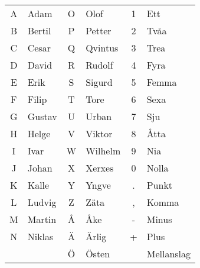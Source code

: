 \begin{center}
\begin{longtable}{cl|cl|cl }
	A & Adam   & O & Olof    & 1 & Ett        \\
	B & Bertil & P & Petter  & 2 & Tvåa       \\
	C & Cesar  & Q & Qvintus & 3 & Trea       \\
	D & David  & R & Rudolf  & 4 & Fyra       \\
	E & Erik   & S & Sigurd  & 5 & Femma      \\
	F & Filip  & T & Tore    & 6 & Sexa       \\
	G & Gustav & U & Urban   & 7 & Sju        \\
	H & Helge  & V & Viktor  & 8 & Åtta       \\
	I & Ivar   & W & Wilhelm & 9 & Nia        \\
	J & Johan  & X & Xerxes  & 0 & Nolla      \\
	K & Kalle  & Y & Yngve   & . & Punkt      \\
	L & Ludvig & Z & Zäta    & , & Komma      \\
	M & Martin & Å & Åke     & - & Minus      \\
	N & Niklas & Ä & Ärlig   & + & Plus       \\
	  &        & Ö & Östen   &   & Mellanslag \\
\end{longtable}
\end{center}

